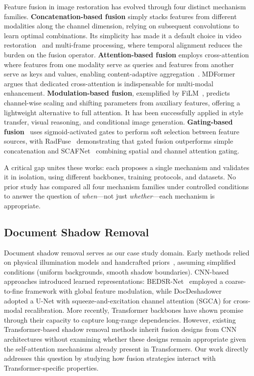 \documentclass[pdflatex,sn-basic,Numbered]{sn-jnl}
\theoremstyle{thmstyleone}
\theoremstyle{thmstyletwo}
\theoremstyle{thmstylethree}
\begin{document}
Feature fusion in image restoration has evolved through four distinct mechanism families.
\textbf{Concatenation-based fusion} simply stacks features from different modalities along the channel dimension, relying on subsequent convolutions to learn optimal combinations.
Its simplicity has made it a default choice in video restoration~\cite{wang2019edvr} and multi-frame processing, where temporal alignment reduces the burden on the fusion operator.
\textbf{Attention-based fusion} employs cross-attention where features from one modality serve as queries and features from another serve as keys and values, enabling content-adaptive aggregation~\cite{mdformer2025,li2023single}.
MDFormer~\cite{mdformer2025} argues that dedicated cross-attention is indispensable for multi-modal enhancement.
\textbf{Modulation-based fusion}, exemplified by FiLM~\cite{perez2018film}, predicts channel-wise scaling and shifting parameters from auxiliary features, offering a lightweight alternative to full attention.
It has been successfully applied in style transfer, visual reasoning, and conditional image generation.
\textbf{Gating-based fusion}~\cite{hu2018squeeze,shazeer2020glu,radfuse2025} uses sigmoid-activated gates to perform soft selection between feature sources, with RadFuse~\cite{radfuse2025} demonstrating that gated fusion outperforms simple concatenation and SCAFNet~\cite{scafnet2025} combining spatial and channel attention gating.

A critical gap unites these works: each proposes a single mechanism and validates it in isolation, using different backbones, training protocols, and datasets.
No prior study has compared all four mechanism families under controlled conditions to answer the question of \textit{when}---not just \textit{whether}---each mechanism is appropriate.

\subsection{Document Shadow Removal}

Document shadow removal serves as our case study domain.
Early methods relied on physical illumination models and handcrafted priors~\cite{bako2016minimal,Liuspectral}, assuming simplified conditions (uniform backgrounds, smooth shadow boundaries).
CNN-based approaches introduced learned representations: BEDSR-Net~\cite{lin2020document} employed a coarse-to-fine framework with global feature modulation, while DocDeshadower~\cite{li2023single} adopted a U-Net with squeeze-and-excitation channel attention (SGCA) for cross-modal recalibration.
More recently, Transformer backbones have shown promise through their capacity to capture long-range dependencies.
However, existing Transformer-based shadow removal methods inherit fusion designs from CNN architectures without examining whether these designs remain appropriate given the self-attention mechanisms already present in Transformers.
Our work directly addresses this question by studying how fusion strategies interact with Transformer-specific properties.
\end{document}
